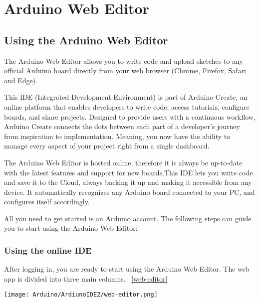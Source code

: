 %
%


\chapter{Arduino Web Editor}


\section{Using the Arduino Web Editor}




The Arduino Web Editor allows you to write code and upload sketches to any official Arduino board directly from your web browser (Chrome, Firefox, Safari and Edge). \cite{arduinoWebEditor:2024}

This IDE (Integrated Development Environment) is part of Arduino Create, an online platform that enables developers to write code, access tutorials, configure boards, and share projects. Designed to provide users with a continuous workflow, Arduino Create connects the dots between each part of a developer's journey from inspiration to implementation. Meaning, you now have the ability to manage every aspect of your project right from a single dashboard.

The Arduino Web Editor is hosted online, therefore it is always be up-to-date with the latest features and support for new boards.This IDE lets you write code and save it to the Cloud, always backing it up and making it accessible from any device. It automatically recognizes any Arduino board connected to your PC, and configures itself accordingly.

All you need to get started is an Arduino account. The following steps can guide you to start using the Arduino Web Editor: \cite{arduinoWebEditor:2024}

\subsection{Using the online IDE}
After logging in, you are ready to start using the Arduino Web Editor. The web app is divided into three main columns. ~\ref{web-editor}


	\begin{center}
		\texttt{[image: Arduino/ArdiunoIDE2/web-editor.png]}
		\label{web-editor}
	\end{center}

